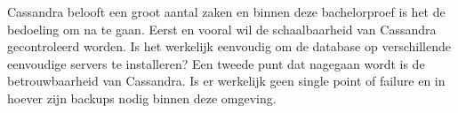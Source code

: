 
Cassandra belooft een groot aantal zaken en binnen deze bachelorproef is het de bedoeling om na te gaan.
Eerst en vooral wil de schaalbaarheid van Cassandra gecontroleerd worden.
Is het werkelijk eenvoudig om de database op verschillende eenvoudige servers te installeren?
Een tweede punt dat nagegaan wordt is de betrouwbaarheid van Cassandra.
Is er werkelijk geen single point of failure en in hoever zijn backups nodig binnen deze omgeving.
